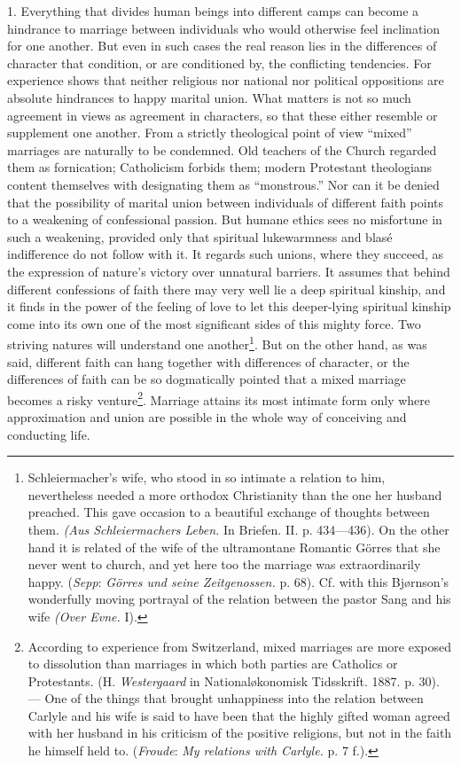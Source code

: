 \documentclass[12pt,a4paper,openany]{book}
\newcommand{\opage}[1]{\marginnote{\footnotesize\textit{[#1]}}}
\begin{document}
1. Everything that divides human beings into different camps can become a hindrance to marriage between individuals who
would otherwise feel inclination for one another. But even in such cases the real reason lies in the differences of
character that condition, or are conditioned by, the conflicting tendencies. For experience shows that neither
religious nor national nor political oppositions are absolute hindrances to happy marital union. What matters is not so
much agreement in views as agreement in characters, so that these either resemble or supplement one another. From a
strictly theological point of view ``mixed'' marriages are naturally to be condemned. Old teachers of the Church
regarded them as fornication; Catholicism forbids them; modern Protestant theologians content themselves with
designating them as ``monstrous.'' Nor can it be denied that the possibility of marital union between individuals of
different faith points to a weakening of
\opage{300}confessional passion. But humane ethics sees no misfortune in such a weakening, provided only that spiritual
lukewarmness and blasé indifference do not follow with it. It regards such unions, where they succeed, as the
expression of nature's victory over unnatural barriers. It assumes that behind different confessions of faith there may
very well lie a deep spiritual kinship, and it finds in the power of the feeling of love to let this deeper-lying
spiritual kinship come into its own one of the most significant sides of this mighty force. Two striving natures will
understand one another\footnote[1]{Schleiermacher's wife, who stood in so intimate a relation to him, nevertheless
needed a more orthodox Christianity than the one her husband preached. This gave occasion to a beautiful exchange of
thoughts between them. \textit{(Aus Schleiermachers Leben.} In Briefen. II. p. 434---436). On the other hand it is
related of the wife of the ultramontane Romantic Görres that she never went to church, and yet here too the marriage was
extraordinarily happy. (\emph{Sepp}: \textit{Görres und seine Zeitgenossen.} p. 68). Cf. with this Bjørnson's
wonderfully moving portrayal of the relation between the pastor Sang and his wife \textit{(Over Evne.} I).}. But on the
other hand, as was said, different faith can hang together with differences of character, or the differences of faith
can be so dogmatically pointed that a mixed marriage becomes a risky venture\footnote[2]{According to experience from
Switzerland, mixed marriages are more exposed to dissolution than marriages in which both parties are Catholics or
Protestants. (H. \emph{Westergaard} in Nationaløkonomisk Tidsskrift. 1887. p. 30). --- One of the things that brought
unhappiness into the relation between Carlyle and his wife is said to have been that the highly gifted woman agreed with
her husband in his criticism of the positive religions, but not in the faith he himself held to. (\emph{Froude}:
\textit{My relations with Carlyle.} p. 7 f.).}. Marriage attains its most intimate form only where approximation and
union are possible in the whole way of conceiving and conducting life.
\end{document}
